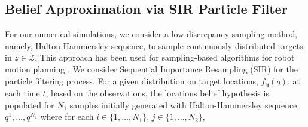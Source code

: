 \documentclass[letterpaper, 10 pt, conference]{ieeeconf}
\begin{document}
\subsection{Belief Approximation via SIR Particle Filter}
For our numerical simulations, we consider a low discrepancy sampling method, namely, Halton-Hammersley sequence, to sample continuously distributed targets in $z \in \mathcal{Z}$. 
This approach has been used for sampling-based algorithms for robot motion planning \cite{lavalle2006planning}.
We consider Sequential Importance Resampling (SIR) \cite{arulampalam2002tutorial} for the particle filtering process.
For a given distribution on target locations, $f_{\bm{q}}(q)$, at each time $t$, based on the observations, the locations belief hypothesis is populated for $N_1$ samples initially generated with Halton-Hammersley sequence,
$q^{1},\dots,q^{N_1}$
where for each $i \in \lbrace 1,\dots,N_1 \rbrace$, $j \in \lbrace 1,\dots,N_2 \rbrace$,
\end{document}
